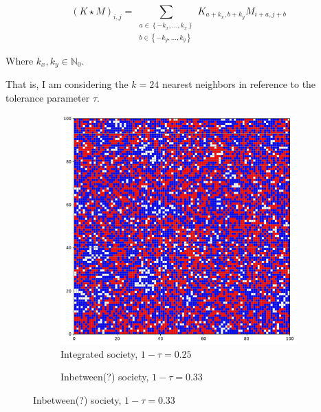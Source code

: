 \documentclass[../main.tex]{subfiles}
\begin{document}
\begin{equation}
(K \star M)_{i, j}=\sum_{\substack{a \in\left\{-k_x, \ldots, k_x\right\} \\ b \in\left\{-k_y, \ldots, k_y\right\}}} K_{a+k_x, b+k_y} M_{i+a, j+b}
\label{eq:convolution}
\end{equation}

Where $k_x, k_y \in \mathbb{N}_0$. 


That is, I am considering the $k=24$ nearest neighbors in reference to the tolerance parameter $\tau$.

\begin{figure}[H]
\centering
\caption{Schelling model simulations}
	\begin{subfigure}{0.45\textwidth}	
	\centering
    \caption{Integrated society, $1-\tau = 0.25$}
	\includegraphics[width=\textwidth]{figs/schelling_model_0.25.pdf}	
	\end{subfigure}	
	\begin{subfigure}{0.45\textwidth}	
	\centering
    \caption{Inbetween(?) society, $1-\tau = 0.33$}

\end{subfigure}
\end{figure}
\end{document}
